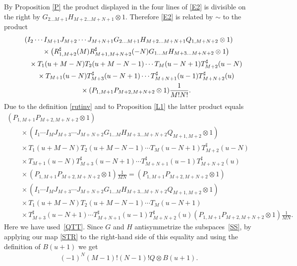 \documentclass[10pt,a4paper]{amsart}
\numberwithin{equation}{section}
\def\ot{\otimes}
\def\RS{R^{\sharp}}
\def\TS{T^{\sharp}}
\begin{document}
By Proposition \ref{P} the product displayed in the four lines of \eqref{E2}
is divisible on the right by
$G_{2 \dots M+1} H_{M+2 \dots M+N+1}\ot1$.
Therefore \eqref{E2} is related by $\sim$ to the product
\begin{gather*}
( I_{2} \cdots I_{M+1}
J_{M+2} \cdots J_{M+N+1}
G_{2 \dots M+1} H_{M+2 \dots M+N+1}
Q_{1,M+N+2}\ot1 )\notag\\ \qquad{} \times
\big(\RS_{1,M+2} (M ) \RS_{M+1,M+N+2} (-N )
G_{1 \dots M} H_{M+3 \dots M+N+2}\ot1 \big)\notag
\\
\qquad{} \times
T_1 (u+M-N) T_2 (u+M-N-1) \cdots T_{M} (u-N+1)
\TS_{M+2} (u-N)\notag
\\ \qquad{} \times
T_{M+1} (u-N)
\TS_{M+3} (u-N+1) \cdots \TS_{M+N+1} (u-1) \TS_{M+N+2} (u)\notag
\\ \qquad{} \times
( P_{1,M+1} P_{M+2,M+N+2}\ot1 ) \frac1{M ! N !} .%
\end{gather*}
Due to the definition \eqref{rutinv} and to
Proposition \ref{L1} the latter product equals
\begin{gather*}
( P_{1,M+1} P_{M+2,M+N+2}\ot1 )\\
\qquad {} \times
( I_{1} \cdots I_{M}
J_{M+3} \cdots J_{M+N+2}
G_{1 \dots M} H_{M+3 \dots M+N+2}
Q_{M+1,M+2}\ot1 )\\
\qquad {} \times
T_1 (u+M-N) T_2 (u+M-N-1) \cdots T_{M} (u-N+1)
\TS_{M+2} (u-N)\\
\qquad {} \times
T_{M+1} (u-N)
\TS_{M+3} (u-N+1) \cdots \TS_{M+N+1} (u-1) \TS_{M+N+2} (u)\\
\qquad {} \times
( P_{1,M+1} P_{M+2,M+N+2}\ot1 ) \frac1{M N} =
( P_{1,M+1} P_{M+2,M+N+2}\ot1 )\\
\qquad {} \times
( I_{1} \cdots I_{M}
J_{M+3} \cdots J_{M+N+2}
G_{1 \dots M} H_{M+3 \dots M+N+2}
Q_{M+1,M+2}\ot1 )\\
\qquad {} \times
T_1 (u+M-N) T_2 (u+M-N-1) \cdots T_{M} (u-N+1)\\
\qquad {} \times
\TS_{M+3} (u-N+1) \cdots \TS_{M+N+1} (u-1) \TS_{M+N+2} (u)
( P_{1,M+1} P_{M+2,M+N+2}\ot1 ) \frac1{M N} .
\end{gather*}
Here we have used~\eqref{QTT}. Since $G$ and $H$ antisymmetrize the subspaces~\eqref{SS},
by applying our map \eqref{STR} to the right-hand side
of this equality and using the definition of $B(u+1)$ we get
\begin{gather}
\label{BQ}
(-1)^N (M-1) ! (N-1) ! Q\ot B(u+1) .
\end{gather}
\end{document}
